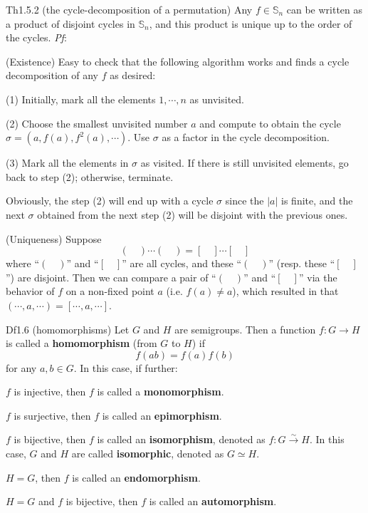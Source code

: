 \documentclass{article}
\begin{document}
\begin{Th}{Th1.5.2 (the cycle-decomposition of a permutation)}
    Any $f\in\mathbb{S}_n$ can be written as a product of disjoint cycles in $\mathbb{S}_n$, and this product is unique up to the order of the cycles.
    \tcblower
    \textit{Pf}: 
    \begin{compactenum}
        \item (Existence) Easy to check that the following algorithm works and finds a cycle decomposition of any $f$ as desired:
        \begin{compactenum}
            \item[(1)] Initially, mark all the elements $1, \cdots, n$ as unvisited.
            \item[(2)] Choose the smallest unvisited number $a$ and compute to obtain the cycle $\sigma = (a, f(a), f^2(a), \cdots)$. Use $\sigma$ as a factor in the cycle decomposition.
            \item[(3)] Mark all the elements in $\sigma$ as visited. If there is still unvisited elements, go back to step (2); otherwise, terminate.
        \end{compactenum}
        Obviously, the step (2) will end up with a cycle $\sigma$ since the $|a|$ is finite, and the next $\sigma$ obtained from the next step (2) will be disjoint with the previous ones.
        \item (Uniqueness) Suppose 
        $$ (\quad)\cdots(\quad) = [\quad]\cdots[\quad] $$
        where ``$(\quad)$'' and ``$[\quad]$'' are all cycles, and these ``$(\quad)$'' (resp. these ``$[\quad]$'') are disjoint. Then we can compare a pair of ``$(\quad)$'' and ``$[\quad]$'' via the behavior of $f$ on a non-fixed point $a$ (i.e. $f(a)\neq a$), which resulted in that $(\cdots, a, \cdots) = [\cdots, a, \cdots]$. 
    \end{compactenum}
\end{Th}

\begin{Df}{Df1.6 (homomorphisms)}
    Let $G$ and $H$ are semigroups. Then a function $f: G\to H$ is called a \textbf{homomorphism} (from $G$ to $H$) if 
    $$ f(ab) = f(a)f(b) $$
    for any $a, b\in G$. In this case, if further:
    \begin{compactenum}
        \item $f$ is injective, then $f$ is called a \textbf{monomorphism}.
        \item $f$ is surjective, then $f$ is called an \textbf{epimorphism}.
        \item $f$ is bijective, then $f$ is called an \textbf{isomorphism}, denoted as $f: G\overset{\sim}{\to} H$. In this case, $G$ and $H$ are called \textbf{isomorphic}, denoted as $G\simeq H$.
        \item $H = G$, then $f$ is called an \textbf{endomorphism}.
        \item $H = G$ and $f$ is bijective, then $f$ is called an \textbf{automorphism}.
    \end{compactenum}
\end{Df}
\end{document}
